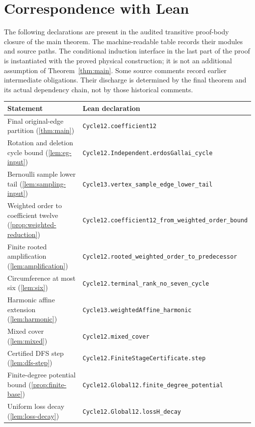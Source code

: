 \section{Correspondence with Lean}\label{app:correspondence}
The following declarations are present in the audited transitive proof-body
closure of the main theorem. The machine-readable table
 records their modules and source paths. The
conditional induction interface in the last part of the proof is instantiated
with the proved physical construction; it is not an additional assumption
of Theorem~\ref{thm:main}. Some source comments record earlier intermediate
obligations. Their discharge is determined by the final theorem and its
actual dependency chain, not by those historical comments.

\begin{longtable}{@{}p{}p{}@{}}
\toprule Statement & Lean declaration\\\midrule\endhead
Final original-edge partition (\ref{thm:main}) & {\small\nolinkurl{Cycle12.coefficient12}}\\[7pt]
Rotation and deletion cycle bound (\ref{lem:eg-input}) & {\small\nolinkurl{Cycle12.Independent.erdosGallai_cycle}}\\[7pt]
Bernoulli sample lower tail (\ref{lem:sampling-input}) & {\small\nolinkurl{Cycle13.vertex_sample_edge_lower_tail}}\\[7pt]
Weighted order to coefficient twelve (\ref{prop:weighted-reduction}) & {\small\nolinkurl{Cycle12.coefficient12_from_weighted_order_bound}}\\[7pt]
Finite rooted amplification (\ref{lem:amplification}) & {\small\nolinkurl{Cycle12.rooted_weighted_order_to_predecessor}}\\[7pt]
Circumference at most six (\ref{lem:six}) & {\small\nolinkurl{Cycle12.terminal_rank_no_seven_cycle}}\\[7pt]
Harmonic affine extension (\ref{lem:harmonic}) & {\small\nolinkurl{Cycle13.weightedAffine_harmonic}}\\[7pt]
Mixed cover (\ref{lem:mixed}) & {\small\nolinkurl{Cycle12.mixed_cover}}\\[7pt]
Certified DFS step (\ref{lem:dfs-step}) & {\small\nolinkurl{Cycle12.FiniteStageCertificate.step}}\\[7pt]
Finite-degree potential bound (\ref{prop:finite-base}) & {\small\nolinkurl{Cycle12.Global12.finite_degree_potential}}\\[7pt]
Uniform loss decay (\ref{lem:loss-decay}) & {\small\nolinkurl{Cycle12.Global12.lossH_decay}}\\[7pt]

\end{longtable}
